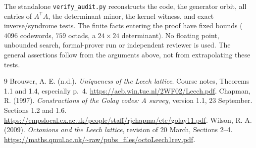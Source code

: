 \documentclass[10pt,reqno]{amsart}
\theoremstyle{remark}\newtheorem{remark}[theorem]{Remark}
\begin{document}
The standalone \texttt{verify\_audit.py} reconstructs the code, the generator orbit, all entries of $A^{\mathsf T}A$, the determinant minor, the kernel witness, and exact inverse/syndrome tests. The finite facts entering the proof have fixed bounds ($4096$ codewords, $759$ octads, a $24\times24$ determinant). No floating point, unbounded search, formal-prover run or independent reviewer is used. The general assertions follow from the arguments above, not from extrapolating these tests.
\begin{thebibliography}{9}
 Brouwer, A. E. (n.d.). \emph{Uniqueness of the Leech lattice}. Course notes, Theorems 1.1 and 1.4, especially p.~4. \url{https://aeb.win.tue.nl/2WF02/Leech.pdf}.
 Chapman, R. (1997). \emph{Constructions of the Golay codes: A survey}, version 1.1, 23 September. Sections 1.2 and 1.6. \url{https://empslocal.ex.ac.uk/people/staff/rjchapma/etc/golay11.pdf}.
 Wilson, R. A. (2009). \emph{Octonions and the Leech lattice}, revision of 20 March, Sections 2--4. \url{https://maths.qmul.ac.uk/~raw/pubs_files/octoLeech1rev.pdf}.
\end{thebibliography}
\end{document}
